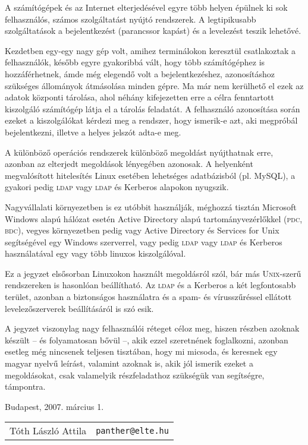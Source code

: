 A számítógépek és az Internet elterjedésével egyre több helyen épülnek ki sok felhasználós, számos szolgáltatást nyújtó
rendszerek. A legtipikusabb szolgáltatások a bejelentkezést (parancssor kapást) és a levelezést teszik lehetővé.

Kezdetben egy-egy nagy gép volt, amihez terminálokon keresztül csatlakoztak a felhasználók, később egyre gyakoribbá
vált, hogy több számítógéphez is hozzáférhetnek, ámde még elegendő volt a bejelentkezéshez, azonosításhoz szükséges
állományok átmásolása minden gépre. Ma már nem kerülhető el ezek az adatok központi tárolása, ahol néhány kifejezetten
erre a célra fenntartott kiszolgáló számítógép látja el a tárolás feladatát. A felhasználó azonosítása során ezeket a
kiszolgálókat kérdezi meg a rendszer, hogy ismerik-e azt, aki megpróbál bejelentkezni, illetve a helyes jelszót adta-e
meg.

A különböző operációs rendszerek különböző megoldást nyújthatnak erre, azonban az elterjedt megoldások lényegében
azonosak. A helyenként megvalósított hitelesítés Linux esetében lehetséges adatbázisból (pl. MySQL), a gyakori pedig
\textsc{ldap} vagy \textsc{ldap} és Kerberos alapokon nyugszik.

Nagyvállalati környezetben is ez utóbbit használják, méghozzá tisztán Microsoft Windows alapú hálózat esetén Active
Directory alapú tartományvezérlőkkel (\textsc{pdc}, \textsc{bdc}), vegyes környezetben pedig vagy Active Directory és
Services for Unix segítségével egy Windows szerverrel, vagy pedig \textsc{ldap} vagy \textsc{ldap} és Kerberos
használatával egy vagy több linuxos kiszolgálóval.

Ez a jegyzet elsősorban Linuxokon használt  megoldásról szól, bár más \textsc{Unix}-szerű rendszereken is hasonlóan
beállítható. Az \textsc{ldap} és a Kerberos a két legfontosabb terület, azonban a biztonságos használatra és a spam- és
vírusszűréssel ellátott levelezőszerverek beállításáról is szó esik.

A jegyzet viszonylag nagy felhasználói réteget céloz meg, hiszen részben azoknak készült -- és folyamatosan bővül --,
akik ezzel szeretnének foglalkozni, azonban esetleg még nincsenek teljesen tisztában, hogy mi micsoda, és keresnek egy
magyar nyelvű leírást, valamint azoknak is, akik jól ismerik ezeket a megoldásokat, csak valamelyik részfeladathoz
szükségük van segítségre, támpontra.

\vspace{1em}\noindent Budapest, 2007. március 1.

\begin{flushright}
  \begin{tabular}{@{}ll}
    Tóth László Attila & \texttt{panther@elte.hu}
\end{tabular}
\end{flushright}




